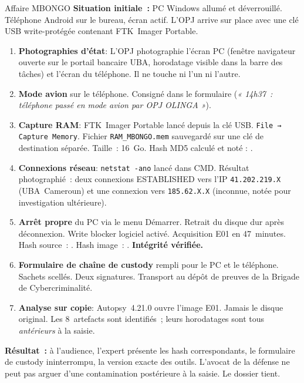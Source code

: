 \begin{boxscenario}{Affaire MBONGO}
\textbf{Situation initiale~:} PC Windows allumé et déverrouillé.
Téléphone Android sur le bureau, écran actif. L'OPJ arrive sur place avec
une clé USB write-protégée contenant FTK~Imager Portable.

\medskip
\begin{enumerate}
    \item \textbf{Photographies d'état}: L'OPJ photographie l'écran PC
          (fenêtre navigateur ouverte sur le portail bancaire UBA,
          horodatage visible dans la barre des tâches) et l'écran du téléphone.
          Il ne touche ni l'un ni l'autre.

    \item \textbf{Mode avion} sur le téléphone. Consigné dans le formulaire
          (\textit{« 14h37~: téléphone passé en mode avion par OPJ OLINGA »}).

    \item \textbf{Capture RAM}: FTK~Imager Portable lancé depuis la clé
          USB. \texttt{File → Capture Memory}. Fichier \texttt{RAM\_MBONGO.mem}
          sauvegardé sur une clé de destination séparée. Taille~: 16~Go.
          Hash MD5 calculé et noté : .

    \item \textbf{Connexions réseau}: \texttt{netstat -ano} lancé dans
          CMD. Résultat photographié~: deux connexions ESTABLISHED vers
          l'IP \texttt{41.202.219.X} (UBA~Cameroun) et une connexion vers
          \texttt{185.62.X.X} (inconnue, notée pour investigation ultérieure).

    \item \textbf{Arrêt propre} du PC via le menu Démarrer. Retrait du
          disque dur après déconnexion. Write blocker logiciel activé.
          Acquisition E01 en 47~minutes. Hash source~: .
          Hash image~: . \textbf{Intégrité vérifiée.}

    \item \textbf{Formulaire de chaîne de custody} rempli pour le PC et le
          téléphone. Sachets scellés. Deux signatures. Transport au dépôt
          de preuves de la Brigade de Cybercriminalité.

    \item \textbf{Analyse sur copie}: Autopsy~4.21.0 ouvre l'image E01.
          Jamais le disque original. Les 8~artefacts sont identifiés~;
          leurs horodatages sont tous \emph{antérieurs} à la saisie.
\end{enumerate}

\textbf{Résultat~:} à l'audience, l'expert présente les hash correspondants,
le formulaire de custody ininterrompu, la version exacte des outils. L'avocat
de la défense ne peut pas arguer d'une contamination postérieure à la saisie.
Le dossier tient.
\end{boxscenario}

